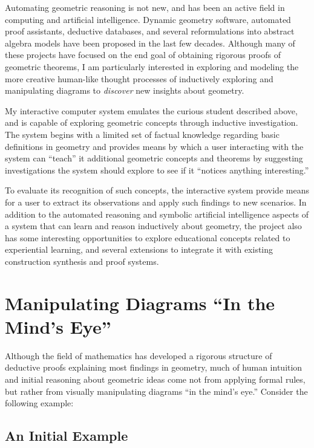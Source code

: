 Automating geometric reasoning is not new, and has been an active
field in computing and artificial intelligence.  Dynamic geometry
software, automated proof assistants, deductive databases, and several
reformulations into abstract algebra models have been proposed in the
last few decades.  Although many of these projects have focused on the
end goal of obtaining rigorous proofs of geometric theorems, I am
particularly interested in exploring and modeling the more creative
human-like thought processes of inductively exploring and manipulating
diagrams to \emph{discover} new insights about geometry.

My interactive computer system emulates the curious student described
above, and is capable of exploring geometric concepts through
inductive investigation.  The system begins with a limited set of
factual knowledge regarding basic definitions in geometry and provides
means by which a user interacting with the system can ``teach'' it
additional geometric concepts and theorems by suggesting
investigations the system should explore to see if it ``notices
anything interesting.''

To evaluate its recognition of such concepts, the interactive system
provide means for a user to extract its observations and apply such
findings to new scenarios.  In addition to the automated reasoning and
symbolic artificial intelligence aspects of a system that can learn
and reason inductively about geometry, the project also has some
interesting opportunities to explore educational concepts related to
experiential learning, and several extensions to integrate it with
existing construction synthesis and proof systems.

\section{Manipulating Diagrams ``In the Mind's Eye''}

Although the field of mathematics has developed a rigorous structure
of deductive proofs explaining most findings in geometry, much of
human intuition and initial reasoning about geometric ideas come not
from applying formal rules, but rather from visually manipulating
diagrams ``in the mind's eye.'' Consider the following example:

\subsection{An Initial Example}

